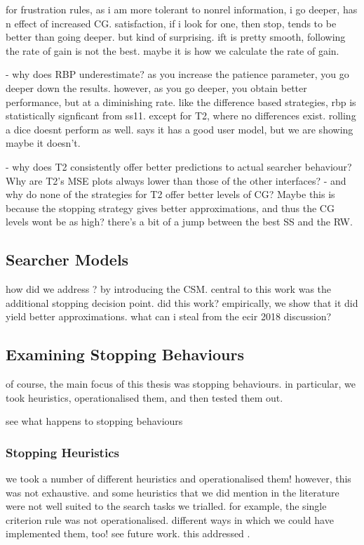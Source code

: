 for frustration rules, as i am more tolerant to nonrel information, i go deeper, has n effect of increased CG.
satisfaction, if i look for one, then stop, tends to be better than going deeper. but kind of surprising.
ift is pretty smooth, following the rate of gain is not the best. maybe it is how we calculate the rate of gain.

- why does RBP underestimate? as you increase the patience parameter, you go deeper down the results. however, as you go deeper, you obtain better performance, but at a diminishing rate. like the difference based strategies, rbp is statistically signficant from ss11. except for T2, where no differences exist. rolling a dice doesnt perform as well. says it has a good user model, but we are showing maybe it doesn't.

- why does T2 consistently offer better predictions to actual searcher behaviour? Why are T2's MSE plots always lower than those of the other interfaces?
    - and why do none of the strategies for T2 offer better levels of CG? Maybe this is because the stopping strategy gives better approximations, and thus the CG levels wont be as high? there's a bit of a jump between the best SS and the RW.


\subsection{Searcher Models}

how did we address ? by introducing the CSM.
central to this work was the additional stopping decision point.
did this work?
empirically, we show that it did yield better approximations.
what can i steal from the ecir 2018 discussion?

\subsection{Examining Stopping Behaviours}

of course, the main focus of this thesis was stopping behaviours.
in particular, we took heuristics, operationalised them, and then tested them out.

see what happens to stopping behaviours 

\subsubsection{Stopping Heuristics}
we took a number of different heuristics and operationalised them!
however, this was not exhaustive.
and some heuristics that we did mention in the literature were not well suited to the search tasks we trialled.
for example, the single criterion rule was not operationalised.
different ways in which we could have implemented them, too! see future work.
this addressed .

